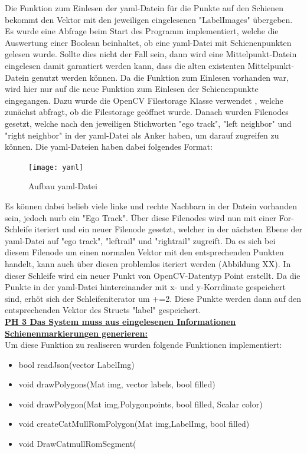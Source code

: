 \documentclass[11pt]{scrartcl}
\begin{document}
\noindent
Die Funktion zum Einlesen der yaml-Datein für die Punkte auf den Schienen bekommt den Vektor mit den jeweiligen eingelesenen "LabelImages" übergeben. Es wurde eine Abfrage beim Start des Programm implementiert, welche die Auswertung einer Boolean beinhaltet, ob eine yaml-Datei mit Schienenpunkten gelesen wurde. Sollte dies nicht der Fall sein, dann wird eine Mittelpunkt-Datein eingelesen damit garantiert werden kann, dass die alten existenten Mittelpunkt-Datein genutzt werden können. Da die Funktion zum Einlesen vorhanden war, wird hier nur auf die neue Funktion zum Einlesen der Schienenpunkte eingegangen. Dazu wurde die OpenCV Filestorage Klasse verwendet , welche zunächst abfragt, ob die Filestorage geöffnet wurde. Danach wurden Filenodes gesetzt, welche nach den jeweiligen Stichworten "ego track", "left neighbor" und "right neighbor" in der yaml-Datei als Anker haben, um darauf zugreifen zu können. Die yaml-Dateien haben dabei folgendes Format:
\begin{figure}[H]
  \texttt{[image: yaml]}
  \caption{Aufbau yaml-Datei}
\end{figure}
\noindent
Es können dabei belieb viele linke und rechte Nachbarn in der Datein vorhanden sein, jedoch nurb ein "Ego Track". Über diese Filenodes wird nun mit einer For-Schleife iteriert und ein neuer Filenode gesetzt, welcher in der nächsten Ebene der yaml-Datei auf "ego track", "leftrail" und "rightrail" zugreift. Da es sich bei diesem Filenode um einen normalen Vektor mit den entsprechenden Punkten handelt, kann auch über diesen problemlos iteriert werden (Abbildung XX). In dieser Schleife wird ein neuer Punkt von OpenCV-Datentyp Point erstellt. Da die Punkte in der yaml-Datei hintereinander mit x- und y-Korrdinate gespeichert sind, erhöt sich der Schleifeniterator um +=2. Diese Punkte werden dann auf den entsprechenden Vektor des Structs "label" gespeichert.
\\

\noindent
\underline{\textbf {PH 3 Das System muss aus eingelesenen Informationen Schienenmarkierungen generieren:}}
\\

\noindent
Um diese Funktion zu realiseren wurden folgende Funktionen implementiert:
\begin{itemize}
	\item bool readJson(vector LabelImg)
	\item void drawPolygons(Mat img, vector labels, bool filled)
	\item void drawPolygon(Mat img,Polygonpoints, bool filled, Scalar color)
	\item void createCatMullRomPolygon(Mat img,LabelImg, bool filled)
	\item void DrawCatmullRomSegment(
\end{itemize}
\end{document}
